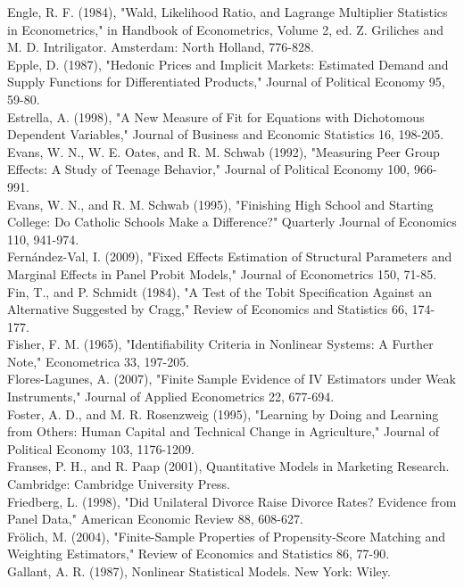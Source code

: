 \documentclass[10pt]{article}
\begin{document}
Engle, R. F. (1984), "Wald, Likelihood Ratio, and Lagrange Multiplier Statistics in Econometrics," in Handbook of Econometrics, Volume 2, ed. Z. Griliches and M. D. Intriligator. Amsterdam: North Holland, 776-828.\\
Epple, D. (1987), "Hedonic Prices and Implicit Markets: Estimated Demand and Supply Functions for Differentiated Products," Journal of Political Economy 95, 59-80.\\
Estrella, A. (1998), "A New Measure of Fit for Equations with Dichotomous Dependent Variables," Journal of Business and Economic Statistics 16, 198-205.\\
Evans, W. N., W. E. Oates, and R. M. Schwab (1992), "Measuring Peer Group Effects: A Study of Teenage Behavior," Journal of Political Economy 100, 966-991.\\
Evans, W. N., and R. M. Schwab (1995), "Finishing High School and Starting College: Do Catholic Schools Make a Difference?" Quarterly Journal of Economics 110, 941-974.\\
Fernández-Val, I. (2009), "Fixed Effects Estimation of Structural Parameters and Marginal Effects in Panel Probit Models," Journal of Econometrics 150, 71-85.\\
Fin, T., and P. Schmidt (1984), "A Test of the Tobit Specification Against an Alternative Suggested by Cragg," Review of Economics and Statistics 66, 174-177.\\
Fisher, F. M. (1965), "Identifiability Criteria in Nonlinear Systems: A Further Note," Econometrica 33, 197-205.\\
Flores-Lagunes, A. (2007), "Finite Sample Evidence of IV Estimators under Weak Instruments," Journal of Applied Econometrics 22, 677-694.\\
Foster, A. D., and M. R. Rosenzweig (1995), "Learning by Doing and Learning from Others: Human Capital and Technical Change in Agriculture," Journal of Political Economy 103, 1176-1209.\\
Franses, P. H., and R. Paap (2001), Quantitative Models in Marketing Research. Cambridge: Cambridge University Press.\\
Friedberg, L. (1998), "Did Unilateral Divorce Raise Divorce Rates? Evidence from Panel Data," American Economic Review 88, 608-627.\\
Frölich, M. (2004), "Finite-Sample Properties of Propensity-Score Matching and Weighting Estimators," Review of Economics and Statistics 86, 77-90.\\
Gallant, A. R. (1987), Nonlinear Statistical Models. New York: Wiley.\\
\end{document}
